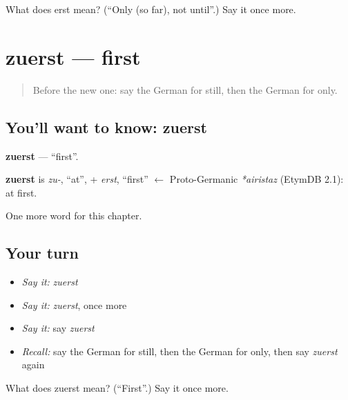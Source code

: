 \begin{tcolorbox}[breakable,colback=teal!4,colframe=teal!35!black,title={Before you move on}]
What does erst mean? (\textquotedblleft{}Only (so far), not until\textquotedblright{}.) Say it once more.
\end{tcolorbox}
\section[zuerst]{zuerst — first}

\label{lesson:GE-C171-zuerst}



\begin{quote}
Before the new one: say the German for still, then the German for only.
\end{quote}

\subsection*{You'll want to know: zuerst}
\textbf{zuerst} — \textquotedblleft{}first\textquotedblright{}.

\begin{cousinweb}
\textbf{zuerst} is \emph{zu-}, \textquotedblleft{}at\textquotedblright{}, + \emph{erst}, \textquotedblleft{}first\textquotedblright{} $\leftarrow$ Proto-Germanic \emph{*airistaz} (EtymDB 2.1): at first.
\end{cousinweb}

\begin{grammarlens}[title={What you've built}]
One more word for this chapter.
\end{grammarlens}

\subsection*{Your turn}
\begin{itemize}
\raggedright
  \item \emph{Say it:} \emph{zuerst}
  \item \emph{Say it:} \emph{zuerst}, once more
  \item \emph{Say it:} say \emph{zuerst}
  \item \emph{Recall:} say the German for still, then the German for only, then say \emph{zuerst} again
\end{itemize}

\begin{tcolorbox}[breakable,colback=teal!4,colframe=teal!35!black,title={Before you move on}]
What does zuerst mean? (\textquotedblleft{}First\textquotedblright{}.) Say it once more.
\end{tcolorbox}
